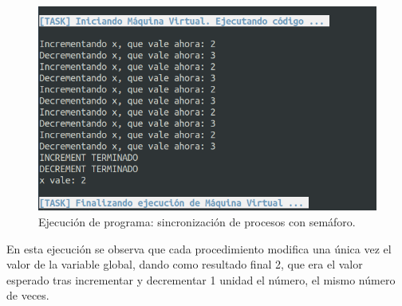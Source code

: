 \begin{figure}[h]
    \includegraphics[width=\linewidth]{images/ejemplos/concurrentes/semaphore.png}
    \caption{Ejecución de programa: sincronización de procesos con semáforo.}
    \label{fig:lamportSemaphore_exec}
\end{figure}

En esta ejecución se observa que cada procedimiento modifica una única vez el valor de la variable global, dando como resultado final 2, que era el valor esperado tras incrementar y decrementar 1 unidad el número, el mismo número de veces.